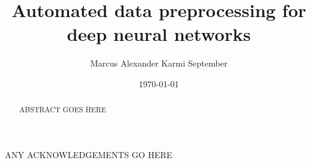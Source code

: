 \documentclass{statsmsc}
\title{Automated data preprocessing for deep neural networks}
\author{Marcus Alexander Karmi September}
\date{\today}
\begin{document}

\maketitle


\declarationdate{\today}
\declaration


\begin{abstract}
    ABSTRACT GOES HERE
\end{abstract}

\begin{acknowledgements}
    ANY ACKNOWLEDGEMENTS GO HERE
\end{acknowledgements}

{\thispagestyle{plain}
    \tableofcontents
}
\end{document}
